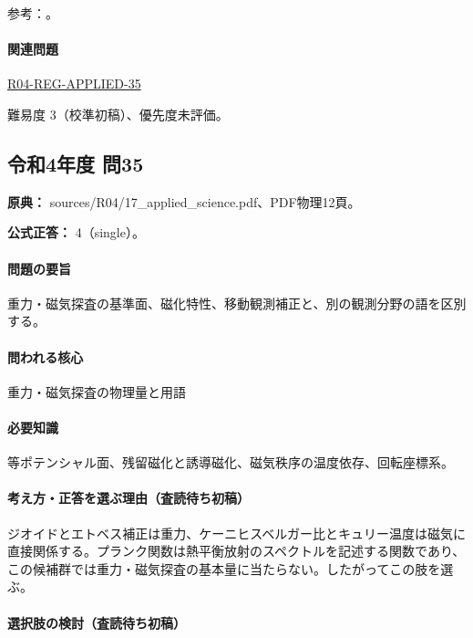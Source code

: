 \par 参考：\cite{gsi_gravity_definitions,kanaya_okuma2011}。

\paragraph{関連問題} \hyperref[q:r04-reg-applied-35]{R04-REG-APPLIED-35}

\par 難易度 3（校準初稿）、優先度未評価。

\subsection{令和4年度 問35}
\label{q:r04-reg-applied-35}

\noindent\textbf{原典：} sources/R04/17\_applied\_science.pdf、PDF物理12頁。

\textbf{公式正答：} 4（single）。

\paragraph{問題の要旨} 重力・磁気探査の基準面、磁化特性、移動観測補正と、別の観測分野の語を区別する。

\paragraph{問われる核心} 重力・磁気探査の物理量と用語

\paragraph{必要知識} 等ポテンシャル面、残留磁化と誘導磁化、磁気秩序の温度依存、回転座標系。

\paragraph{考え方・正答を選ぶ理由（査読待ち初稿）} ジオイドとエトベス補正は重力、ケーニヒスベルガー比とキュリー温度は磁気に直接関係する。プランク関数は熱平衡放射のスペクトルを記述する関数であり、この候補群では重力・磁気探査の基本量に当たらない。したがってこの肢を選ぶ。

\paragraph{選択肢の検討（査読待ち初稿）}\mbox{}\par

